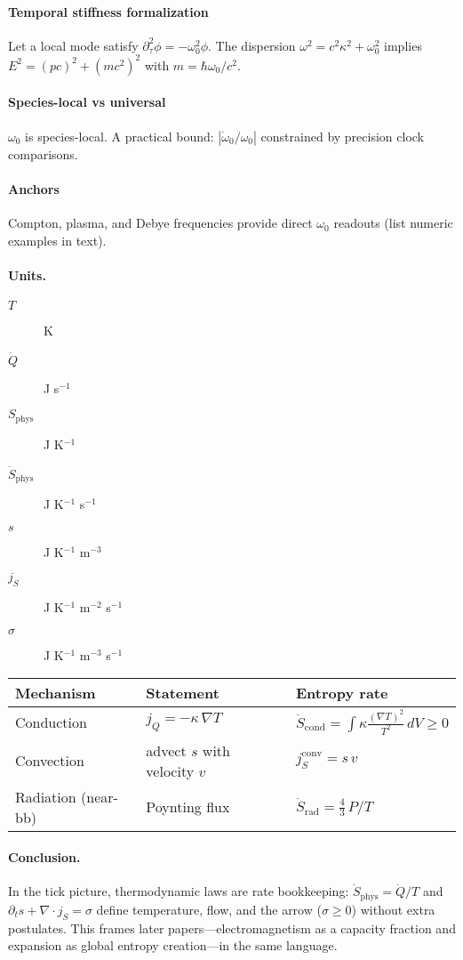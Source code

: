 \paragraph{Temporal stiffness formalization}
Let a local mode satisfy \(\partial_\tau^2\phi=-\omega_0^2\phi\). The dispersion \(\omega^2=c^2\kappa^2+\omega_0^2\) implies \(E^2=(pc)^2+(mc^2)^2\) with \(m=\hbar\omega_0/c^2\).
\paragraph{Species-local vs universal}
\(\omega_0\) is species-local. A practical bound: \(|\dot\omega_0/\omega_0|\) constrained by precision clock comparisons.
\paragraph{Anchors}
Compton, plasma, and Debye frequencies provide direct \(\omega_0\) readouts (list numeric examples in text).

\paragraph{Units.}
\begin{description}
\item[$T$] K \quad \item[$\dot Q$] J s$^{-1}$
\item[$S_{\mathrm{phys}}$] J K$^{-1}$ \quad \item[$\dot S_{\mathrm{phys}}$] J K$^{-1}$ s$^{-1}$
\item[$s$] J K$^{-1}$ m$^{-3}$ \quad \item[$j_S$] J K$^{-1}$ m$^{-2}$ s$^{-1}$
\item[$\sigma$] J K$^{-1}$ m$^{-3}$ s$^{-1}$
\end{description}

\begin{table}[h]
\centering
\begin{tabular}{lll}
\toprule
Mechanism & Statement & Entropy rate \\
\midrule
Conduction & $j_Q=-\kappa \, \nabla T$ & $\dot S_{\mathrm{cond}}=\int \kappa \frac{(\nabla T)^2}{T^2}\,dV \ge 0$ \\
Convection & advect $s$ with velocity $v$ & $j_S^{\mathrm{conv}} = s\,v$ \\
Radiation (near-bb) & Poynting flux & $\dot S_{\mathrm{rad}} = \tfrac{4}{3}\,P/T$ \\
\bottomrule
\end{tabular}
\end{table}

\paragraph{Conclusion.}
In the tick picture, thermodynamic laws are rate bookkeeping: $\dot S_{\mathrm{phys}}=\dot Q/T$ and $\partial_t s+\nabla\!\cdot j_S=\sigma$ define temperature, flow, and the arrow ($\sigma\ge 0$) without extra postulates. This frames later papers---electromagnetism as a capacity fraction and expansion as global entropy creation---in the same language.
